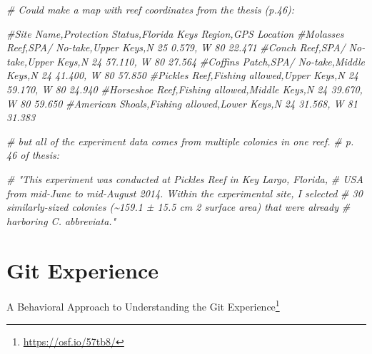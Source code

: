 \documentclass[
]{krantz}
\makeatletter
\newenvironment{Shaded}{\begin{snugshade}}{\end{snugshade}}
\newcommand{\CommentTok}[1]{\textcolor[rgb]{0.37,0.37,0.37}{\textit{#1}}}
\renewcommand{\href}[2]{#2\footnote{\url{#1}}}
\newenvironment{kframe}{%
\medskip{}
\setlength{\fboxsep}{.8em}
 \def\at@end@of@kframe{}%
 \ifinner\ifhmode%
  \def\at@end@of@kframe{\end{minipage}}%
  \begin{minipage}{\columnwidth}%
 \fi\fi%
 \def\FrameCommand##1{\hskip\@totalleftmargin \hskip-\fboxsep
 \colorbox{shadecolor}{##1}\hskip-\fboxsep
     \hskip-\linewidth \hskip-\@totalleftmargin \hskip\columnwidth}%
 \MakeFramed {\advance\hsize-\width
   \@totalleftmargin\z@ \linewidth\hsize
   \@setminipage}}%
 {\par\unskip\endMakeFramed%
 \at@end@of@kframe}
\renewenvironment{Shaded}{\begin{kframe}}{\end{kframe}}
\makeatother
\begin{document}
\begin{Shaded}
\begin{Highlighting}[]
\CommentTok{\# Could make a map with reef coordinates from the thesis (p.46):}

\CommentTok{\#Site Name,Protection Status,Florida Keys Region,GPS Location}
\CommentTok{\#Molasses Reef,SPA/ No{-}take,Upper Keys,N 25 0.579, W 80 22.471}
\CommentTok{\#Conch Reef,SPA/ No{-}take,Upper Keys,N 24 57.110, W 80 27.564}
\CommentTok{\#Coffins Patch,SPA/ No{-}take,Middle Keys,N 24 41.400, W 80 57.850}
\CommentTok{\#Pickles Reef,Fishing allowed,Upper Keys,N 24 59.170, W 80 24.940}
\CommentTok{\#Horseshoe Reef,Fishing allowed,Middle Keys,N 24 39.670, W 80 59.650}
\CommentTok{\#American Shoals,Fishing allowed,Lower Keys,N 24 31.568, W 81 31.383}

\CommentTok{\# but all of the experiment data comes from multiple colonies in one reef.}
\CommentTok{\# p. 46 of thesis:}

\CommentTok{\# "This experiment was conducted at Pickles Reef in Key Largo, Florida,}
\CommentTok{\# USA from mid{-}June to mid{-}August 2014. Within the experimental site, I selected }
\CommentTok{\# 30 similarly{-}sized colonies (\textasciitilde{}159.1 ± 15.5 cm 2 surface area) that were already }
\CommentTok{\# harboring C. abbreviata."}
\end{Highlighting}
\end{Shaded}

\hypertarget{git-experience}{%
\section*{Git Experience}\label{git-experience}}


\href{https://osf.io/57tb8/}{A Behavioral Approach to Understanding the Git Experience}
\end{document}
